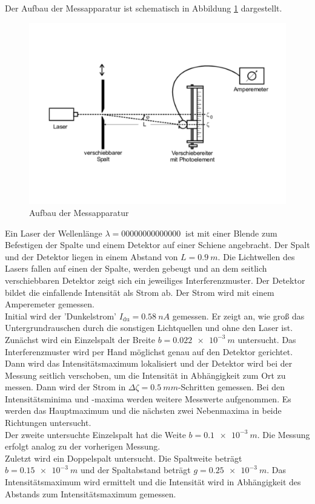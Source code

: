 Der Aufbau der Messapparatur ist schematisch in Abbildung \ref{fig:aufbau} dargestellt.
\begin{figure}[h!]
  \centering
  \includegraphics[width=\textwidth]{aufbau.pdf}
  \caption{Aufbau der Messapparatur \cite{1}}
  \label{fig:aufbau}
\end{figure}
Ein Laser der Wellenlänge $\lambda=\SI{00000000000000}{}$ ist mit einer Blende zum Befestigen der Spalte und einem Detektor auf einer Schiene angebracht.
Der Spalt und der Detektor liegen in einem Abstand von $L=\SI{0.9}{m}$.
Die Lichtwellen des Lasers fallen auf einen der Spalte, werden gebeugt und an dem seitlich verschiebbaren Detektor zeigt sich ein jeweiliges Interferenzmuster.
Der Detektor bildet die einfallende Intensität als Strom ab.
Der Strom wird mit einem Amperemeter gemessen.
\\Initial wird der 'Dunkelstrom' $I_{\text{du}}=\SI{0.58}{nA}$ gemessen.
Er zeigt an, wie groß das Untergrundrauschen durch die sonstigen Lichtquellen und ohne den Laser ist.
\\Zunächst wird ein Einzelspalt der Breite $b=\SI{0.022e-3}{m}$ untersucht.
Das Interferenzmuster wird per Hand möglichst genau auf den Detektor gerichtet.
Dann wird das Intensitätsmaximum lokalisiert und der Detektor wird  bei der Messung seitlich verschoben, um die Intensität in Abhängigkeit zum Ort zu messen.
Dann wird der Strom in $\Delta \zeta =\SI{0.5}{mm}$-Schritten gemessen.
Bei den Intensitätsminima und -maxima werden weitere Messwerte aufgenommen.
Es werden das Hauptmaximum und die nächsten zwei Nebenmaxima in beide Richtungen untersucht.
\\Der zweite untersuchte Einzelspalt hat die Weite $b= \SI{0.1e-3}{m}$.
Die Messung erfolgt analog zu der vorherigen Messung.
\\Zuletzt wird ein Doppelspalt untersucht.
Die Spaltweite beträgt $b= \SI{0.15e-3}{m}$ und der Spaltabstand beträgt $g=\SI{0.25e-3}{m}$.
Das Intensitätsmaximum wird ermittelt und die Intensität wird in Abhängigkeit des Abstands zum Intensitätsmaximum gemessen.


\FloatBarrier
